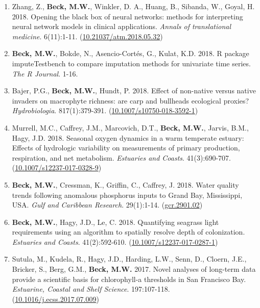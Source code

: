 \documentclass[letterpaper,12pt]{article}
\begin{document}
\begin{enumerate}
\item Zhang, Z., \textbf{Beck, M.W.}, Winkler, D. A., Huang, B., Sibanda, W., Goyal, H. 2018. Opening the black box of neural networks: methods for interpreting neural network models in clinical applications. \textit{Annals of translational medicine}. 6(11):1-11. ({\footnotesize\href{http://dx.doi.org/10.21037/atm.2018.05.32}{10.21037/atm.2018.05.32}})

\item \textbf{Beck, M.W.}, Bokde, N., Asencio-Cort\'{e}s, G., Kulat, K.D. 2018. R package imputeTestbench to compare imputation methods for univariate time series. \textit{The R Journal}. 1-16.

\item Bajer, P.G., \textbf{Beck, M.W.}, Hundt, P. 2018. Effect of non-native versus native invaders on macrophyte richness: are carp and bullheads ecological proxies? \textit{Hydrobiologia}. 817(1):379-391. ({\footnotesize\href{https://link.springer.com/article/10.1007/s10750-018-3592-1}{10.1007/s10750-018-3592-1}})

\item Murrell, M.C., Caffrey, J.M., Marcovich, D.T., \textbf{Beck, M.W.}, Jarvis, B.M., Hagy, J.D. 2018. Seasonal oxygen dynamics in a warm temperate estuary: Effects of hydrologic variability on measurements of primary production, respiration, and net metabolism. \textit{Estuaries and Coasts}. 41(3):690-707. ({\footnotesize\href{https://link.springer.com/article/10.1007/s12237-017-0328-9}{10.1007/s12237-017-0328-9}})

\item \textbf{Beck, M.W.}, Cressman, K., Griffin, C., Caffrey, J. 2018. Water quality trends following anomalous phosphorus inputs to Grand Bay, Mississippi, USA. \textit{Gulf and Caribbean Research}. 29(1):1-14. ({\footnotesize\href{https://aquila.usm.edu/gcr/vol29/iss1/2/}{gcr.2901.02}})

\item \textbf{Beck, M.W.}, Hagy, J.D., Le, C. 2018. Quantifying seagrass light requirements using an algorithm to spatially resolve depth of colonization. \textit{Estuaries and Coasts}. 41(2):592-610. ({\footnotesize\href{http://dx.doi.org/10.1007/s12237-017-0287-1}{10.1007/s12237-017-0287-1}})

\item Sutula, M., Kudela, R., Hagy, J.D., Harding, L.W., Senn, D., Cloern, J.E., Bricker, S., Berg, G.M., \textbf{Beck, M.W.} 2017. Novel analyses of long-term data provide a scientific basis for chlorophyll-a thresholds in San Francisco Bay. \textit{Estuarine, Coastal and Shelf Science}. 197:107-118. ({\footnotesize\href{https://doi.org/10.1016/j.ecss.2017.07.009}{10.1016/j.ecss.2017.07.009}})


\end{enumerate}
\end{document}
